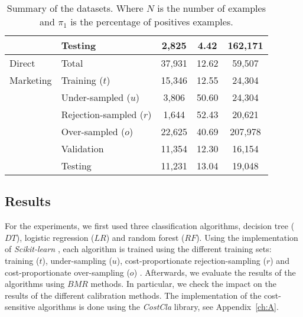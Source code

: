 \begin{table}
\begin{tabular}{l l c c c }
    &Testing&2,825&4.42&162,171\\
    \hline
    Direct &Total&37,931&12.62&59,507\\
    Marketing&Training ($t$)&15,346&12.55&24,304\\
    &Under-sampled ($u$)&3,806&50.60&24,304\\
    &Rejection-sampled ($r$)&1,644&52.43&20,621\\
    &Over-sampled ($o$)&22,625&40.69&207,978\\
    &Validation&11,354&12.30&16,154\\
    &Testing&11,231&13.04&19,048\\
    \hline
  \end{tabular}
  \caption{Summary of the datasets. Where $N$ is the number of examples and $\pi_1$ is the 
  percentage of positives examples.}
  \label{tab:6:databases}
\end{table}
 

\subsection{Results}


  For the experiments, we first used three classification algorithms, decision tree ($DT$), 
logistic 
  regression ($LR$) and random forest ($RF$). Using the implementation of \textit{Scikit-learn} 
  \citep{Pedregosa2011}, each algorithm is trained using the different training sets: training 
  ($t$), under-sampling ($u$), cost-proportionate rejection-sampling  ($r$) \citep{Zadrozny2003}   
  and   cost-proportionate over-sampling ($o$) \citep{Elkan2001}. Afterwards,  we evaluate the 
  results of  the algorithms using $BMR$ methods. In particular, we   check the impact on the 
  results of the different calibration methods. The implementation of the cost-sensitive algorithms 
  is done using the \textit{CostCla} library, see Appendix~\ref{ch:A}.
  
